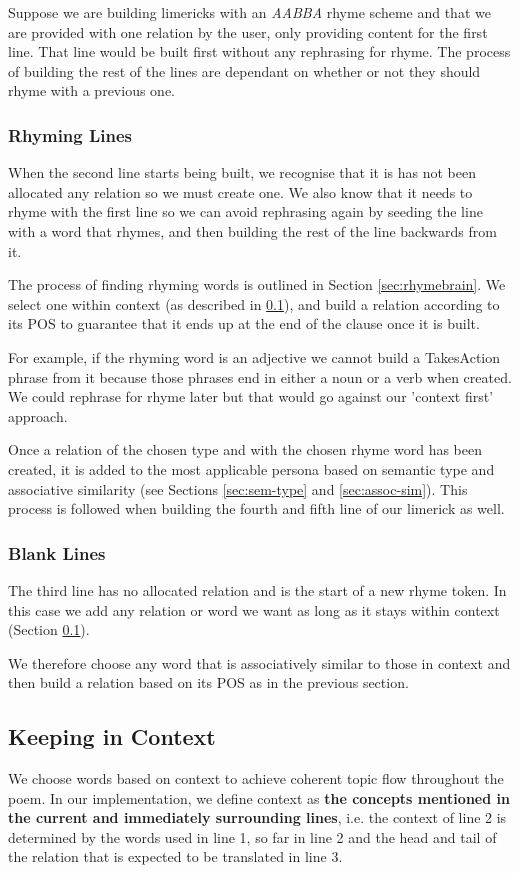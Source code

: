 Suppose we are building limericks with an \textit{AABBA} rhyme scheme and that we are provided with one relation by the user, only providing content for the first line. That line would be built first without any rephrasing for rhyme. The process of building the rest of the lines are dependant on whether or not they should rhyme with a previous one.

\subsubsection{Rhyming Lines}
When the second line starts being built, we recognise that it is has not been allocated any relation so we must create one. We also know that it needs to rhyme with the first line so we can avoid rephrasing again by seeding the line with a word that rhymes, and then building the rest of the line backwards from it.

The process of finding rhyming words is outlined in Section \ref{sec:rhymebrain}. We select one within context (as described in \ref{sec:context}), and build a relation according to its POS to guarantee that it ends up at the end of the clause once it is built.

For example, if the rhyming word is an adjective we cannot build a TakesAction phrase from it because those phrases end in either a noun or a verb when created. We could rephrase for rhyme later but that would go against our 'context first' approach.

Once a relation of the chosen type and with the chosen rhyme word has been created, it is added to the most applicable persona based on semantic type and associative similarity (see Sections \ref{sec:sem-type} and \ref{sec:assoc-sim}). This process is followed when building the fourth and fifth line of our limerick as well.

\subsubsection{Blank Lines}
The third line has no allocated relation and is the start of a new rhyme token. In this case we add any relation or word we want as long as it stays within context (Section \ref{sec:context}).

We therefore choose any word that is associatively similar to those in context and then  build a relation based on its POS as in the previous section.

\subsection{Keeping in Context}
\label{sec:context}
We choose words based on context to achieve coherent topic flow throughout the poem. In our implementation, we define context as \textbf{the concepts mentioned in the current and immediately surrounding lines}, i.e. the context of line 2 is determined by the words used in line 1, so far in line 2 and the head and tail of the relation that is expected to be translated in line 3. 

